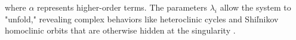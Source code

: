 \documentclass[12pt, a4paper, oneside]{book}
\theoremstyle{plain}
\theoremstyle{definition}
\theoremstyle{remark}
\theoremstyle{definition}
\begin{document}
where $\alpha$ represents higher-order terms. The parameters $\lambda_i$ allow the system to "unfold," revealing complex behaviors like heteroclinic cycles and Shiľnikov homoclinic orbits that are otherwise hidden at the singularity \cite{ibanez2005shil}.

\end{document}
